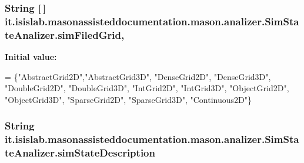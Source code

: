 \hypertarget{classit_1_1isislab_1_1masonassisteddocumentation_1_1mason_1_1analizer_1_1_sim_state_analizer_af21adec0b3c44f8bfc09cd83d6eeb917}{
\subsubsection[{sim\-Filed\-Grid}]{\setlength{\rightskip}{0pt plus 5cm}String \mbox{[}$\,$\mbox{]} it.\-isislab.\-masonassisteddocumentation.\-mason.\-analizer.\-Sim\-State\-Analizer.\-sim\-Filed\-Grid\hspace{0.3cm}{\ttfamily [static]}, {\ttfamily [private]}}}\label{classit_1_1isislab_1_1masonassisteddocumentation_1_1mason_1_1analizer_1_1_sim_state_analizer_af21adec0b3c44f8bfc09cd83d6eeb917}
{\bfseries Initial value\-:}
\begin{DoxyCode}
= \{\textcolor{stringliteral}{"AbstractGrid2D"},\textcolor{stringliteral}{"AbstractGrid3D"}, \textcolor{stringliteral}{"DenseGrid2D"},
                                            \textcolor{stringliteral}{"DenseGrid3D"}, \textcolor{stringliteral}{"DoubleGrid2D"}, \textcolor{stringliteral}{"DoubleGrid3D"},
                                            \textcolor{stringliteral}{"IntGrid2D"}, \textcolor{stringliteral}{"IntGrid3D"}, \textcolor{stringliteral}{"ObjectGrid2D"}, \textcolor{stringliteral}{"ObjectGrid3D"},
                                            \textcolor{stringliteral}{"SparseGrid2D"}, \textcolor{stringliteral}{"SparseGrid3D"}, \textcolor{stringliteral}{"Continuous2D"}\}
\end{DoxyCode}
\hypertarget{classit_1_1isislab_1_1masonassisteddocumentation_1_1mason_1_1analizer_1_1_sim_state_analizer_ab98fca6fef047e90490ba9f87cc5fcc0}{
\subsubsection[{sim\-State\-Description}]{\setlength{\rightskip}{0pt plus 5cm}String it.\-isislab.\-masonassisteddocumentation.\-mason.\-analizer.\-Sim\-State\-Analizer.\-sim\-State\-Description\hspace{0.3cm}{\ttfamily [static]}}}\label{classit_1_1isislab_1_1masonassisteddocumentation_1_1mason_1_1analizer_1_1_sim_state_analizer_ab98fca6fef047e90490ba9f87cc5fcc0}
